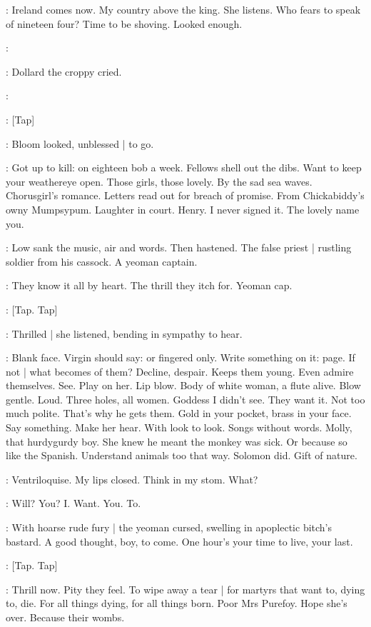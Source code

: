 \BloomInt:
Ireland comes now.
My country above the king.
She listens.
Who fears to speak of nineteen four?
Time to be shoving.
Looked enough.

\dollard:

:
Dollard the croppy cried.

\dollard:

\stripling:
[Tap]

:
Bloom looked,
unblessed |
to go.

\BloomInt:
Got up to kill:
on eighteen bob a week.
Fellows shell out the dibs.
Want to keep your weathereye open.
Those girls,
those lovely.
By the sad sea waves.
Chorusgirl's romance.
Letters read out for breach of promise.
From Chickabiddy's owny Mumpsypum.
Laughter in court.
Henry.
I never signed it.
The lovely name you.

:
Low sank the music,
air and words.
Then hastened.
The false priest |
rustling soldier from his cassock.
A yeoman captain.

\BloomInt:
They know it all by heart.
The thrill they itch for.
Yeoman cap.

\stripling:
[Tap. Tap]

:
Thrilled |
she listened,
bending in sympathy to hear.

\BloomInt:
Blank face.
Virgin should say:
or fingered only.
Write something on it:
page.
If not |
what becomes of them?
Decline,
despair.
Keeps them young.
Even admire themselves.
See.
Play on her.
Lip blow.
Body of white woman,
a flute alive.
Blow gentle.
Loud.
Three holes,
all women.
Goddess I didn't see.
They want it.
Not too much polite.
That's why he gets them.
Gold in your pocket,
brass in your face.
Say something.
Make her hear.
With look to look.
Songs without words.
Molly,
that hurdygurdy boy.
She knew he meant the monkey was sick.
Or because so like the Spanish.
Understand animals too that way.
Solomon did.
Gift of nature.

\BloomInt:
Ventriloquise.
My lips closed.
Think in my stom.
What?

\BloomInt:
Will?
You?
I.
Want.
You.
To.

:
With hoarse rude fury |
the yeoman cursed,
swelling in apoplectic bitch's bastard.
A good thought,
boy,
to come.
One hour's your time to live,
your last.

\stripling:
[Tap.
Tap]

\BloomInt:
Thrill now.
Pity they feel.
To wipe away a tear |
for martyrs that want to,
dying to,
die.
For all things dying,
for all things born.
Poor Mrs Purefoy.
Hope she's over.
Because their wombs.

